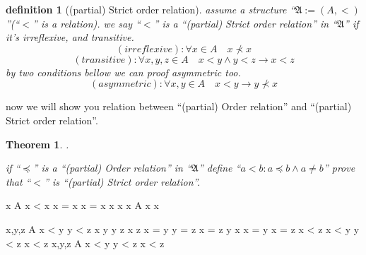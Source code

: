 \documentclass[10pt,a4paper]{book}
\newtheorem{definition}{definition}[section]
\newtheorem{theorem}{Theorem}[section]
\begin{document}
\begin{definition}[(partial) Strict order relation]
     assume  a structure ``$\mathfrak{A} := (A , <  ) $''(``$< $'' is a relation).
    we say ``$<  $''
    is a ``(partial) Strict order relation'' in  ``$\mathfrak{A}$'' if it's  irreflexive, and transitive.
    \[ (irreflexive) :  \forall x \in A \quad x \nprec  x \]
    \[ (transitive) :  \forall x,y,z \in A \quad x < y \land y < z \to x < z  \]
    by two conditions bellow we can proof asymmetric too.
    \[ (asymmetric) :   \forall x,y \in A \quad x < y \to y \nprec x \]

\end{definition}

now we will show you relation between ``(partial) Order relation'' and
``(partial) Strict order relation''.

\begin{theorem}.

    \setlength{\itemsep}{0pt} %
    if ``$\preceq $'' is a ``(partial) Order relation'' in ``$\mathfrak{A}$''
    define ``$a < b : a \preceq b \land a \not= b $'' prove that ``$< $''
    is ``(partial) Strict order relation''.

\end{theorem}

\begin{fitchproof}[arrayenv=tabular]
    \open
     { x \in A }    
    \open
     { x < x }     
     { x \not= x }     
     { x = x }     
     { \bot  }           
    \close
     { x \nprec x }             
    \close
     {\forall x \in A \quad x \nprec x }  
\end{fitchproof}

\begin{fitchproof}[arrayenv=tabular]
    \open
     { x,y,z \in A }      
    \open
     { x < y }       
     { y < z }        
     { x \preceq y }   
     { y \preceq z }    
     { x \preceq z } 
     { x \not= y }    
     { y \not= z }     
    \open
     { x = z }     
     { y \preceq x }  
     { x = y }        
     { \bot  }       
    \close
     { x \not= z }       
     { x < z }        
    \close
     { x < y \land y < z \to x < z }        
    \close
     {\forall x,y,z \in A \quad x < y \land y < z \to x < z }   

\end{fitchproof}
\end{document}
